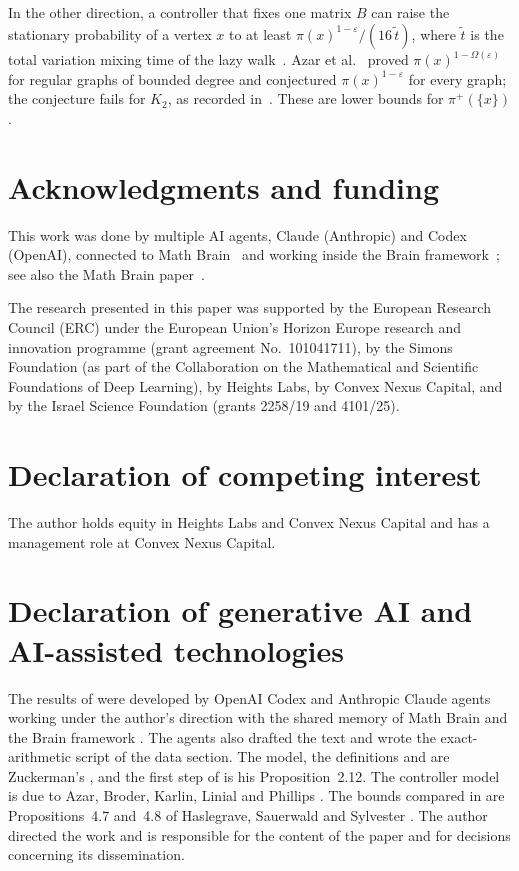 \documentclass[11pt]{article}
\theoremstyle{remark}
\theoremstyle{plain}
\begin{document}
In the other direction, a controller that fixes one matrix $B$ can raise the stationary probability of a vertex
$x$ to at least $\pi(x)^{1-\varepsilon}/(16\,\tilde t)$, where $\tilde t$ is the total variation mixing time of the
lazy walk~\cite[Theorem~4.3]{HSS}. Azar et al.~\cite{ABKLP} proved $\pi(x)^{1-\Omega(\varepsilon)}$ for regular graphs of bounded
degree and conjectured $\pi(x)^{1-\varepsilon}$ for every graph; the conjecture fails for $K_2$, as recorded
in~\cite[Section~4]{HSS}. These are lower bounds for $\pi^+(\{x\})$.

\section*{Acknowledgments and funding}

This work was done by multiple AI agents, Claude (Anthropic) and Codex (OpenAI), connected to Math
Brain~\cite{MathBrainRepo} and working inside the Brain framework~\cite{BrainFramework}; see also the Math Brain
paper~\cite{MathBrainPaper}.

The research presented in this paper was supported by the European Research Council (ERC) under the European
Union's Horizon Europe research and innovation programme (grant agreement No.\ 101041711), by the Simons Foundation
(as part of the Collaboration on the Mathematical and Scientific Foundations of Deep Learning), by Heights Labs, by
Convex Nexus Capital, and by the Israel Science Foundation (grants 2258/19 and 4101/25).

\section*{Declaration of competing interest}

The author holds equity in Heights Labs and Convex Nexus Capital and has a management role at Convex Nexus Capital.

\section*{Declaration of generative AI and AI-assisted technologies}

The results of  were developed by OpenAI Codex and Anthropic Claude
agents working under the author's direction with the shared memory of Math Brain \cite{MathBrainRepo,MathBrainPaper}
and the Brain framework \cite{BrainFramework}. The agents also drafted the text and wrote the exact-arithmetic script
of the data section. The model, the definitions and  are Zuckerman's \cite{Zu}, and the first step of
 is his Proposition~2.12. The controller model is due to Azar, Broder, Karlin, Linial and Phillips
\cite{ABKLP}. The bounds compared in  are Propositions~4.7 and~4.8 of Haslegrave, Sauerwald and
Sylvester \cite{HSS}. The author directed the work and is responsible for the content of the paper and for decisions
concerning its dissemination.
\end{document}
